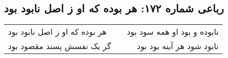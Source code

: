 \begin{center}
\section*{رباعی شماره ۱۷۲: هر بوده که او ز اصل نابود بود}
\label{sec:sh172}
\begin{longtable}{l p{0.5cm} r}
هر بوده که او ز اصل نابود بود
&&
نابوده و بود او همه سود بود
\\
گر یک نفسش پسند مقصود بود
&&
نابود شود هر آینه بود بود
\\
\end{longtable}
\end{center}
